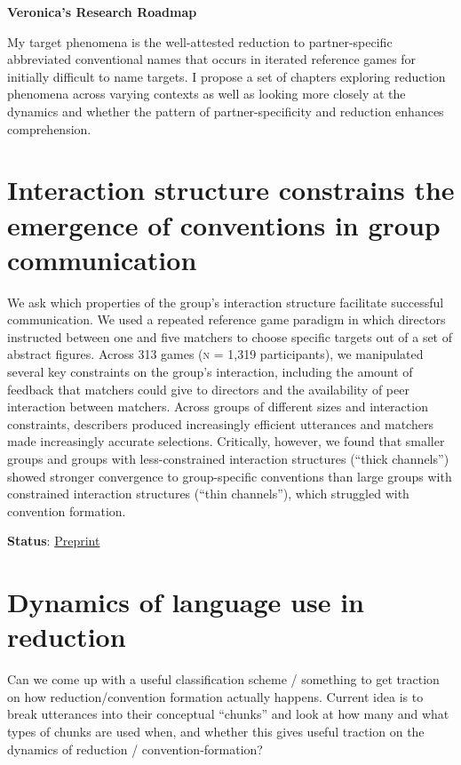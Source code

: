 \documentclass[]{article}
\begin{document}
\begin{center}
\Large \textbf{Veronica's Research Roadmap}
\end{center}

My target phenomena is the well-attested reduction to partner-specific abbreviated conventional names that occurs in iterated reference games for initially difficult to name targets. I propose a set of chapters exploring reduction phenomena across varying contexts as well as looking more closely at the dynamics and whether the pattern of partner-specificity and reduction enhances comprehension. 

\section{Interaction structure constrains the emergence of conventions in group communication}
We ask which properties of the group’s interaction structure facilitate
successful communication. We used a repeated reference game paradigm in which directors
instructed between one and five matchers to choose specific targets out of a set of abstract
figures. Across 313 games (\textsc{n} = 1,319 participants), we manipulated several key constraints on
the group’s interaction, including the amount of feedback that matchers could give to directors
and the availability of peer interaction between matchers. Across groups of different sizes and
interaction constraints, describers produced increasingly efficient utterances and matchers made
increasingly accurate selections. Critically, however, we found that smaller groups and groups
with less-constrained interaction structures (“thick channels”) showed stronger convergence
to group-specific conventions than large groups with constrained interaction structures (“thin
channels”), which struggled with convention formation. 

\textbf{Status}: \href{https://osf.io/preprints/psyarxiv/a3wfy}{Preprint}


\section{Dynamics of language use in reduction}
Can we come up with a useful classification scheme / something to get traction on how reduction/convention formation actually happens. Current idea is to break utterances into their conceptual ``chunks'' and look at how many and what types of chunks are used when, and whether this gives useful traction on the dynamics of reduction / convention-formation? 
\end{document}
